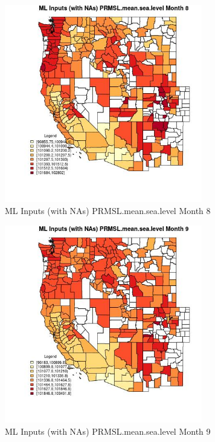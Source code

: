 \begin{figure} 
\centering  
\includegraphics[width=0.77\textwidth]{Code_Outputs/Report_ML_input_PM25_Step4_part_f_de_duplicated_aveswNAs_CountyPRMSLmeansealevelmedianMonth8.jpg} 
\caption{\label{fig:Report_ML_input_PM25_Step4_part_f_de_duplicated_aveswNAsCountyPRMSLmeansealevelmedianMonth8}ML Inputs (with NAs) PRMSL.mean.sea.level Month 8} 
\end{figure} 
 

\clearpage 

\begin{figure} 
\centering  
\includegraphics[width=0.77\textwidth]{Code_Outputs/Report_ML_input_PM25_Step4_part_f_de_duplicated_aveswNAs_CountyPRMSLmeansealevelmedianMonth9.jpg} 
\caption{\label{fig:Report_ML_input_PM25_Step4_part_f_de_duplicated_aveswNAsCountyPRMSLmeansealevelmedianMonth9}ML Inputs (with NAs) PRMSL.mean.sea.level Month 9} 
\end{figure} 
 

